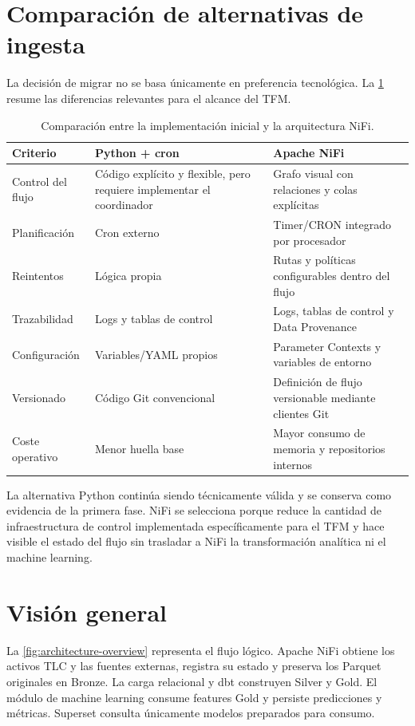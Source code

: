 \section{Comparación de alternativas de ingesta}

La decisión de migrar no se basa únicamente en preferencia tecnológica. La \cref{tab:python-vs-nifi} resume las diferencias relevantes para el alcance del TFM\@.

\begin{table}[H]
\centering
\caption{Comparación entre la implementación inicial y la arquitectura NiFi.}%
\label{tab:python-vs-nifi}%
\small
\begin{tabularx}{\textwidth}{lXX}
\toprule
\textbf{Criterio} & \textbf{Python + cron} & \textbf{Apache NiFi} \\
\midrule
Control del flujo & Código explícito y flexible, pero requiere implementar el coordinador & Grafo visual con relaciones y colas explícitas \\
Planificación & Cron externo & Timer/CRON integrado por procesador \\
Reintentos & Lógica propia & Rutas y políticas configurables dentro del flujo \\
Trazabilidad & Logs y tablas de control & Logs, tablas de control y Data Provenance \\
Configuración & Variables/YAML propios & Parameter Contexts y variables de entorno \\
Versionado & Código Git convencional & Definición de flujo versionable mediante clientes Git \\
Coste operativo & Menor huella base & Mayor consumo de memoria y repositorios internos \\
\bottomrule
\end{tabularx}
\end{table}

La alternativa Python continúa siendo técnicamente válida y se conserva como evidencia de la primera fase. NiFi se selecciona porque reduce la cantidad de infraestructura de control implementada específicamente para el TFM y hace visible el estado del flujo sin trasladar a NiFi la transformación analítica ni el machine learning.

\section{Visión general}

La \cref{fig:architecture-overview} representa el flujo lógico. Apache NiFi obtiene los activos TLC y las fuentes externas, registra su estado y preserva los Parquet originales en Bronze. La carga relacional y dbt construyen Silver y Gold. El módulo de machine learning consume features Gold y persiste predicciones y métricas. Superset consulta únicamente modelos preparados para consumo.

